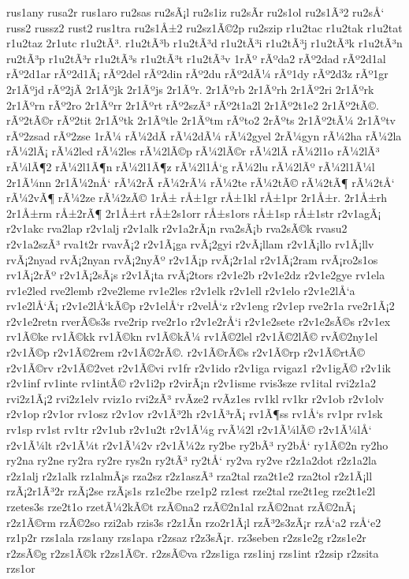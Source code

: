 {rus1any
rusa2r
rus1aro
ru2sas
ru2sÃ¡l
ru2s1iz
ru2sÃ­r
ru2s1ol
ru2s1Ã³2
ru2sÅ‘
russ2
russz2
rust2
rus1tra
ru2s1Å±2
ru2sz1Ã©2p
ru2szip
r1u2tac
r1u2tak
r1u2tat
r1u2taz
2r1utc
r1u2tÃ³.
r1u2tÃ³b
r1u2tÃ³d
r1u2tÃ³i
r1u2tÃ³j
r1u2tÃ³k
r1u2tÃ³n
ru2tÃ³p
r1u2tÃ³r
r1u2tÃ³s
r1u2tÃ³t
r1u2tÃ³v
1rÃº
rÃºda2
rÃº2dad
rÃº2d1al
rÃº2d1ar
rÃº2d1Ã¡
rÃº2del
rÃº2din
rÃº2du
rÃº2dÃ¼
rÃº1dy
rÃº2d3z
rÃº1gr
2r1Ãºjd
rÃº2jÃ­
2r1Ãºjk
2r1Ãºjs
2r1Ãºr.
2r1Ãºrb
2r1Ãºrh
2r1Ãº2ri
2r1Ãºrk
2r1Ãºrn
rÃº2ro
2r1Ãºrr
2r1Ãºrt
rÃº2szÃ³
rÃº2t1a2l
2r1Ãº2t1e2
2r1Ãº2tÃ©.
rÃº2tÃ©r
rÃº2tit
2r1Ãºtk
2r1Ãºtle
2r1Ãºtm
rÃºto2
2rÃºts
2r1Ãº2tÃ¼
2r1Ãºtv
rÃº2zsad
rÃº2zse
1rÃ¼
rÃ¼2dÃ­
rÃ¼2dÃ¼
rÃ¼2gyel
2rÃ¼gyn
rÃ¼2ha
rÃ¼2la
rÃ¼2lÃ¡
rÃ¼2led
rÃ¼2les
rÃ¼2lÃ©p
rÃ¼2lÃ©r
rÃ¼2lÃ­
rÃ¼2l1o
rÃ¼2lÃ³
rÃ¼lÃ¶2
rÃ¼2l1Ã¶n
rÃ¼2l1Ã¶z
rÃ¼2l1Å‘g
rÃ¼2lu
rÃ¼2lÃº
rÃ¼2l1Ã¼l
2r1Ã¼nn
2r1Ã¼2nÅ‘
rÃ¼2rÃ­
rÃ¼2rÃ¼
rÃ¼2te
rÃ¼2tÃ©
rÃ¼2tÃ¶
rÃ¼2tÅ‘
rÃ¼2vÃ¶
rÃ¼2ze
rÃ¼2zÃ©
1rÅ±
rÅ±1gr
rÅ±1kl
rÅ±1pr
2r1Å±r.
2r1Å±rh
2r1Å±rm
rÅ±2rÃ¶
2r1Å±rt
rÅ±2s1orr
rÅ±s1ors
rÅ±1sp
rÅ±1str
r2v1agÃ¡
r2v1akc
rva2lap
r2v1alj
r2v1alk
r2v1a2rÃ¡n
rva2sÃ¡b
rva2sÃ©k
rvasu2
r2v1a2szÃ³
rva1t2r
rvavÃ¡2
r2v1Ã¡ga
rvÃ¡2gyi
r2vÃ¡llam
r2v1Ã¡llo
rv1Ã¡llv
rvÃ¡2nyad
rvÃ¡2nyan
rvÃ¡2nyÃº
r2v1Ã¡p
rvÃ¡2r1al
r2v1Ã¡2ram
rvÃ¡ro2s1os
rv1Ã¡2rÃº
r2v1Ã¡2sÃ¡s
r2v1Ã¡ta
rvÃ¡2tors
r2v1e2b
r2v1e2dz
r2v1e2gye
rv1ela
rv1e2led
rve2lemb
r2ve2leme
rv1e2les
r2v1elk
r2v1ell
r2v1elo
r2v1e2lÅ‘a
rv1e2lÅ‘Ã¡
r2v1e2lÅ‘kÃ©p
r2v1elÅ‘r
r2velÅ‘z
r2v1eng
r2v1ep
rve2r1a
rve2r1Ã¡2
r2v1e2retn
rverÃ©s3s
rve2rip
rve2r1o
r2v1e2rÅ‘i
r2v1e2sete
r2v1e2sÃ©s
r2v1ex
rv1Ã©ke
rv1Ã©kk
rv1Ã©kn
rv1Ã©kÃ¼
rv1Ã©2lel
r2v1Ã©2lÃ©
rvÃ©2ny1el
r2v1Ã©p
r2v1Ã©2rem
r2v1Ã©2rÃ©.
r2v1Ã©rÃ©s
r2v1Ã©rp
r2v1Ã©rtÃ©
r2v1Ã©rv
r2v1Ã©2vet
r2v1Ã©vi
rv1fr
r2v1ido
r2v1iga
rvigaz1
r2v1igÃ©
r2v1ik
r2v1inf
rv1inte
rv1intÃ©
r2v1i2p
r2virÃ¡n
r2v1isme
rvis3sze
rv1ital
rvi2z1a2
rvi2z1Ã¡2
rvi2z1elv
rviz1o
rvi2zÃ³
rvÃ­ze2
rvÃ­z1es
rv1kl
rv1kr
r2v1ob
r2v1olv
r2v1op
r2v1or
rv1osz
r2v1ov
r2v1Ã³2h
r2v1Ã³rÃ¡
rv1Ã¶ss
rv1Å‘s
rv1pr
rv1sk
rv1sp
rv1st
rv1tr
r2v1ub
r2v1u2t
r2v1Ã¼g
rvÃ¼2l
r2v1Ã¼lÃ©
r2v1Ã¼lÅ‘
r2v1Ã¼lt
r2v1Ã¼t
r2v1Ã¼2v
r2v1Ã¼2z
ry2be
ry2bÃ³
ry2bÅ‘
ry1Ã©2n
ry2ho
ry2na
ry2ne
ry2ra
ry2re
rys2n
ry2tÃ³
ry2tÅ‘
ry2va
ry2ve
r2z1a2dot
r2z1a2la
r2z1alj
r2z1alk
rz1almÃ¡s
rza2sz
r2z1aszÃ³
rza2tal
rza2t1e2
rza2tol
r2z1Ã¡ll
rzÃ¡2r1Ã³2r
rzÃ¡2se
rzÃ¡s1s
rz1e2be
rze1p2
rz1est
rze2tal
rze2t1eg
rze2t1e2l
rzetes3s
rze2t1o
rzetÃ¼2kÃ©t
rzÃ©na2
rzÃ©2n1al
rzÃ©2nat
rzÃ©2nÃ¡
r2z1Ã©rm
rzÃ©2so
rzi2ab
rzis3s
r2z1Ã­n
rzo2r1Ã¡l
rzÃ³2s3zÃ¡r
rzÅ‘a2
rzÅ‘e2
rz1p2r
rzs1ala
rzs1any
rzs1apa
r2zsaz
r2z3sÃ¡r.
rz3seben
r2zs1e2g
r2zs1e2r
r2zsÃ©g
r2zs1Ã©k
r2zs1Ã©r.
r2zsÃ©va
r2zs1iga
rzs1inj
rzs1int
r2zsip
r2zsita
rzs1or
}
